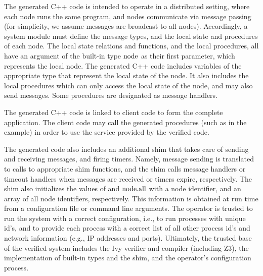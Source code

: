 
The generated C++ code is intended to operate in a distributed
setting, where each node runs the same program, and nodes communicate
via message passing (for simplicity, we assume messages are broadcast
to all nodes). Accordingly, a system module must define the message
types, and the local state and procedures of each node. The local
state relations and functions, and the local procedures, all have an
argument of the built-in type ${\text{node}}$ as their first parameter, which
represents the local node.  The generated C++ code includes variables
of the appropriate type that represent the local state of the node.
It also includes the local procedures which can only access the
local state of the node, and may also send messages. Some procedures
are designated as message handlers.

The generated C++ code is linked to client code to form the complete
application. The client code may call the generated procedures (such
as {\prequestvote} in the example) in order to use the service
provided by the verified code.

The generated code also includes an additional shim that takes care of
sending and receiving messages, and firing timers. Namely, message
sending is translated to calls to appropriate shim functions, and the
shim calls message handlers or timeout handlers when messages are
received or timers expire, respectively. The shim also initializes the
values of {\self} and ${\text{node}}.{\text{all}}$ with a node identifier, and an
array of all node identifiers, respectively. This information is
obtained at run time from a configuration file or command line
arguments. The operator is trusted to run the system with a correct
configuration, i.e., to run processes with unique id's, and to provide
each process with a correct list of all other process id's and network
information (e.g., IP addresses and ports).
Ultimately, the trusted
base of the verified system includes the Ivy verifier and compiler
(including Z3), the implementation of built-in types and the shim, and
the operator's configuration process.

